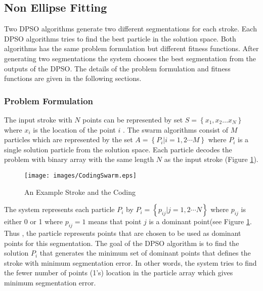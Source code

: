 \subsection{Non Ellipse Fitting}
\label{sec:SwarmSegmentation}
Two DPSO algorithms generate two different segmentations for each stroke. Each DPSO algorithms tries to find the best particle in the solution space. Both algorithms has the same problem formulation but different fitness functions. After generating two segmentations the system chooses the best segmentation from the outputs of the DPSO. The details of the problem formulation and fitness functions are given in the following sections.
\subsubsection{Problem Formulation}
\label{sec:ProblemFormulation}
The input stroke with $N$ points can be represented by set $S = \left\{ {x_1 ,x_2  \ldots x_N } \right\}$ where $x_i$ is the location of the point $i$ . The swarm algorithms consist of $M$ particles which are represented by the set 
$A  = \left\{ {P_i \left| {i = 1,2 \cdots M} \right.} \right\}$ where $P_i$ is a single solution particle from the solution space. Each particle decodes the problem with binary array with the same length $N$ as the input stroke (Figure \ref{fig:CodingSwarm}).   
\begin{figure}
	\centering
		\texttt{[image: images/CodingSwarm.eps]}
	\caption{An Example Stroke and the Coding}
	\label{fig:CodingSwarm}
\end{figure}
The system represents each particle $P_i$ by $P_i = \left\{ {p_{ij} \left| {j = 1,2 \cdots N} \right.} \right\}$ where $p_{ij}$ is either 0 or 1 where $p_{ij}=1$ means that point $j$ is a dominant point(see Figure \ref{fig:CodingSwarm}.  Thus , the particle represents points that are chosen to be used as dominant points for this segmentation. 
The goal of the DPSO algorithm is to find the solution $P_i$ that generates the minimum set of dominant points that defines the stroke with minimum segmentation error. In other words, the system tries to find the fewer number of points (1's) location in the particle array which gives minimum segmentation error.  


